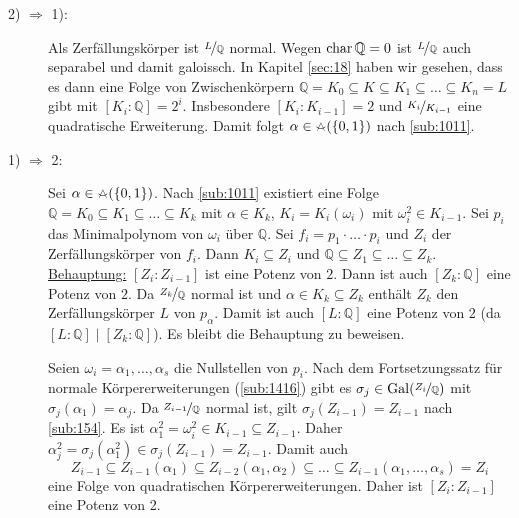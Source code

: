 \begin{description}
	\item[2) $\Rightarrow $ 1):] Als Zerfällungskörper ist $\nicefrac{L}{\mathds{Q}}$ normal. Wegen $\Char \mathds{Q} =0$ ist $\nicefrac{L}{\mathds{Q}}$ auch separabel und
	damit galoissch. In Kapitel \ref{sec:18} haben wir gesehen, dass es dann eine Folge von Zwischenkörpern $\mathds{Q}= K_0 \subseteq  K \subseteq K_1 \subseteq  \ldots \subseteq K_n=L$
	gibt mit $[K_i :\mathds{Q}]=2^i$. Insbesondere $[K_i : K_{i-1}]=2$ und $\nicefrac{K_i}{K_{i-1}}$ eine quadratische Erweiterung. Damit folgt 
	$\alpha \in \zirkel(\{0,1\})$ nach \ref{sub:1011}.
	\item[1) $\Rightarrow $ 2:] Sei $\alpha \in \zirkel( \{0,1\})$. Nach \ref{sub:1011} existiert eine Folge $\mathds{Q}= K_0 \subseteq K_1 \subseteq \ldots \subseteq K_k$
	mit $\alpha \in K_k$, $K_i = K_i(\omega_i)$ mit $\omega_i^2 \in K_{i-1}$. Sei $p_i$ das Minimalpolynom von $\omega_i$ über $\mathds{Q}$. Sei
	$f_i = p_1 \cdot \ldots \cdot p_i$ und $Z_i$ der Zerfällungskörper von $f_i$. Dann $K_i \subseteq Z_i$ und $\mathds{Q} \subseteq Z_1  \subseteq  \ldots \subseteq Z_k$.\\	
	\uline{Behauptung:} $[Z_i : Z_{i-1}]$ ist eine Potenz von $2$. Dann ist auch $[Z_k : \mathds{Q}]$ eine Potenz von $2$. Da $\nicefrac{Z_k}{\mathds{Q}}$ normal ist und
	$\alpha \in K_k \subseteq Z_k$ enthält $Z_k$ den Zerfällungskörper $L$ von $p_\alpha$. Damit ist auch $[L:\mathds{Q}]$ eine Potenz von $2$ (da 
	$[L:\mathds{Q}] \mid [Z_k :\mathds{Q}]$). Es bleibt die Behauptung zu beweisen.
	
	Seien $\omega_i = \alpha_1, \ldots , \alpha_s$ die Nullstellen von $p_i$. Nach dem Fortsetzungssatz für normale Körpererweiterungen (\ref{sub:1416}) gibt es 
	$\sigma_j  \in \Gal (\nicefrac{Z_i}{\mathds{Q}})$ mit $\sigma_j(\alpha_1) = \alpha_j$. Da $\nicefrac{Z_{i-1}}{\mathds{Q}}$ normal ist, gilt 
	$\sigma_j(Z_{i-1}) = Z_{i-1}$ nach \ref{sub:154}. Es ist $\alpha_1^2 = \omega_i^2 \in K_{i-1} \subseteq Z_{i-1}$. Daher 
	$\alpha_j^2 = \sigma_j(\alpha_1^2) \in \sigma_j(Z_{i-1}) = Z_{i-1}$. Damit auch
	\[
		Z_{i-1} \subseteq Z_{i-1}(\alpha_1) \subseteq Z_{i-2}(\alpha_1, \alpha_2) \subseteq  \ldots \subseteq Z_{i-1} (\alpha_1, \ldots , \alpha_s) = Z_i
	\]
	eine Folge von quadratischen Körpererweiterungen. Daher ist $[Z_i : Z_{i-1}]$ eine Potenz von 2. \bewende
\end{description}

